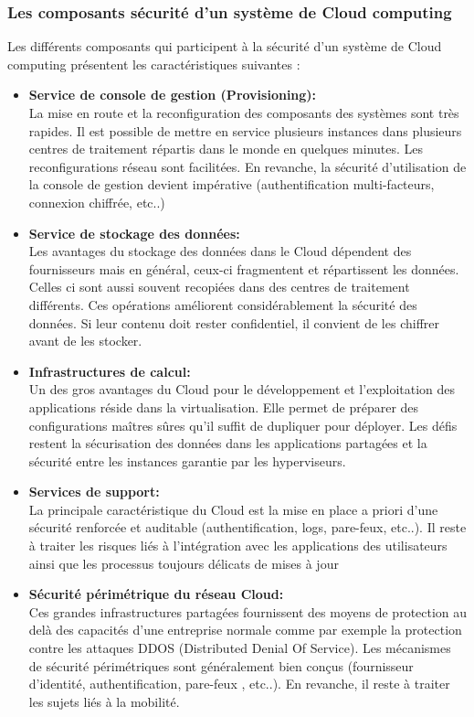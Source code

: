 \subsubsection{Les composants sécurité d’un système de Cloud computing}
Les différents composants qui participent à la sécurité d’un système de Cloud computing présentent les caractéristiques suivantes :
\begin{itemize}
	 
\item \textbf{Service de console de gestion (Provisioning):}\\
La mise en route et la reconfiguration des composants des systèmes sont très rapides. Il est possible de mettre en service plusieurs instances dans plusieurs centres de traitement répartis dans le monde en quelques minutes. Les reconfigurations réseau sont facilitées. En revanche, la sécurité d’utilisation de la console de gestion devient impérative (authentification multi-facteurs, connexion chiffrée, etc..)

\item \textbf{Service de stockage des données:}\\
Les avantages du stockage des données dans le Cloud dépendent des fournisseurs mais en général, ceux-ci fragmentent et répartissent les données. Celles ci sont aussi souvent recopiées dans des centres de traitement différents. Ces opérations améliorent considérablement la sécurité des données. Si leur contenu doit rester confidentiel, il convient de les chiffrer avant de les stocker.

\item \textbf{Infrastructures de calcul:}\\
Un des gros avantages du Cloud pour le développement et l’exploitation des applications réside dans la virtualisation. Elle permet de préparer des configurations maîtres sûres qu’il suffit de dupliquer pour déployer. Les défis restent la sécurisation des données dans les applications partagées et  la sécurité entre les instances garantie par les hyperviseurs.
\item \textbf{Services de support:}\\
La principale caractéristique du Cloud est la mise en place a priori d’une sécurité renforcée et auditable (authentification, logs, pare-feux, etc..). Il reste à traiter les risques liés à l’intégration avec les applications des utilisateurs ainsi que les processus toujours délicats de mises à jour
\item \textbf{Sécurité périmétrique du réseau Cloud:}\\
Ces grandes infrastructures partagées fournissent des moyens de protection au delà des capacités  d’une entreprise normale comme par exemple la protection contre les attaques DDOS (Distributed Denial Of Service). Les mécanismes de sécurité périmétriques sont généralement bien conçus (fournisseur d’identité, authentification, pare-feux , etc..). En revanche, il reste à traiter les sujets liés à la mobilité.

\end{itemize}


